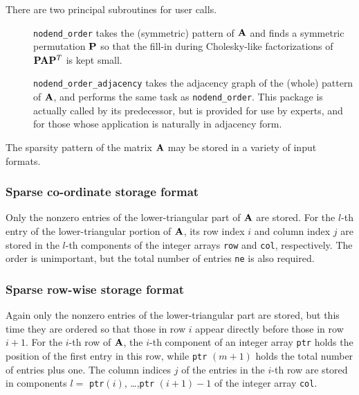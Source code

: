 \documentclass{galahad}
\newcommand{\packagename}{nodend}
\begin{document}
\noindent There are two principal subroutines for user calls.

\begin{description}

\item[] {\tt \packagename\_order} takes the (symmetric) pattern of ${\mathbf{A}}$
 and finds a symmetric permutation ${\mathbf{P}}$ so that the fill-in
 during Cholesky-like factorizations of ${\mathbf{P}} {\mathbf{A}} {\mathbf{P}}^T$
 is kept small.

\item[] {\tt \packagename\_order\_adjacency} takes the adjacency graph of 
 the (whole) pattern of ${\mathbf{A}}$, and performs the same task as
 {\tt \packagename\_order}. This package is actually called
 by its predecessor, but is provided for use by experts, and for
 those whose application is naturally in adjacency form.
\end{description}


\galmatrix
The sparsity pattern of the matrix ${\mathbf{A}}$ may be stored in 
a variety of input formats.

\subsubsection{Sparse co-ordinate storage format}\label{coordinate}
Only the nonzero entries of the lower-triangular part of ${\mathbf{A}}$ are stored.
For the $l$-th entry of the lower-triangular portion of ${\mathbf{A}}$,
its row index $i$ and column index $j$
are stored in the $l$-th components of the integer arrays 
{\tt row} and {\tt col}, respectively.
The order is unimportant, but the total number of entries
{\tt ne} is also required.

\subsubsection{Sparse row-wise storage format}\label{rowwise}
Again only the nonzero entries of the lower-triangular part are stored,
but this time they are ordered so that those in row $i$ appear directly
before those in row $i+1$. For the $i$-th row of ${\mathbf{A}}$, the $i$-th component
of an integer array {\tt ptr} holds the position of the first entry in this row,
while {\tt ptr} $(m+1)$ holds the total number of entries plus one.
The column indices $j$ of the entries in the $i$-th row are 
stored in components $l =$ {\tt ptr}$(i)$, \ldots ,{\tt ptr} $(i+1)-1$ 
of the integer array {\tt col}.
\end{document}

